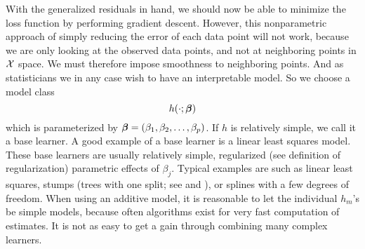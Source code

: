 With the generalized residuals in hand, we should now be able to minimize the loss function by performing gradient descent. However, this nonparametric approach of simply reducing the error of each data point will not work, because we are only looking at the observed data points, and not at neighboring points in $\mathcal{X}$ space. We must therefore impose smoothness to neighboring points. And as statisticians we in any case wish to have an interpretable model. So we choose a model class
\begin{equation}
    h(\cdot;\boldsymbol{\beta})
\end{equation}
which is parameterized by $\boldsymbol{\beta}=(\beta_1,\beta_2,\ldots,\beta_p)$. If $h$ is relatively simple, we call it a base learner. A good example of a base learner is a linear least squares model. These base learners are usually relatively simple, regularized (see definition of regularization) parametric effects of $\beta_j$. Typical examples are such as linear least squares, stumps (trees with one split; see \citet{buhlmann2007} and \citet{ESL}), or splines with a few degrees of freedom. When using an additive model, it is reasonable to let the individual $h_m$'s be simple models, because often algorithms exist for very fast computation of estimates. It is not as easy to get a gain through combining many complex learners.


